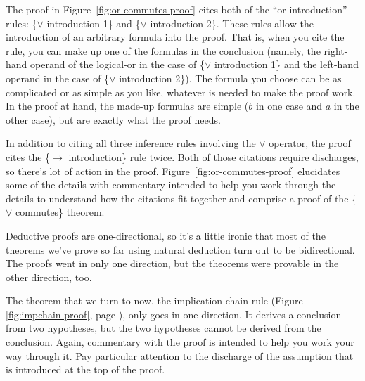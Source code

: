 {The proof in Figure~\ref{fig:or-commutes-proof} cites both of the
``or introduction'' rules:
\{$\vee$ introduction 1\} and \{$\vee$ introduction 2\}.
These rules allow the introduction of an arbitrary formula
into the proof.
That is, when you cite the rule, you can make up one of the
formulas in the conclusion (namely, the right-hand operand of
the logical-or in the case of \{$\vee$ introduction 1\}
and the left-hand operand in the case of \{$\vee$ introduction 2\}).
The formula you choose can be as complicated or as simple as you like,
whatever is needed to make the proof work.
In the proof at hand,
the made-up formulas are simple ($b$ in one case and $a$ in the other case),
but are exactly what the proof needs.

In addition to citing all three inference rules involving the $\vee$ operator,
the proof cites the \{$\rightarrow$ introduction\} rule twice.
Both of those citations require discharges,
so there's lot of action in the proof.
Figure~\ref{fig:or-commutes-proof}
elucidates some of the details with commentary
intended to help you work through the details
to understand how the citations fit together and
comprise a proof of the \{$\vee$ commutes\} theorem.

Deductive proofs are one-directional,
so it's a little ironic that most
of the theorems we've prove so far using natural deduction
turn out to be bidirectional.
The proofs went in only one direction,
but the theorems were provable in the other direction, too.

The theorem that we turn to now, the implication chain rule
(Figure \ref{fig:impchain-proof}, page \pageref{fig:impchain-proof}),
only goes in one direction.
It derives a conclusion from two hypotheses,
but the two hypotheses cannot be derived from the conclusion.
Again, commentary with the proof is intended
to help you work your way through it.
Pay particular attention to the discharge of the
assumption that is introduced at the top of the proof.

}
